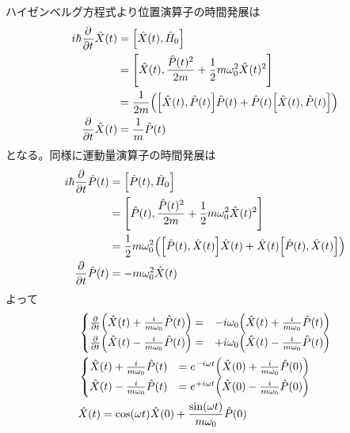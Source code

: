 \documentclass[../ap_2013.tex]{subfiles}
\begin{document}
\section{}
ハイゼンベルグ方程式より位置演算子の時間発展は
\begin{equation}\begin{aligned}[b]
    i\hbar\pdv{t}\hat{X}(t)
        &= \qty[\hat{X}(t),\hat{H}_0]\\
        &= \qty[\hat{X}(t),\frac{\hat{P}(t)^2}{2m}+\frac{1}{2}m\omega_0^2\hat{X}(t)^2]\\
        &= \frac{1}{2m}\qty(\qty[\hat{X}(t),\hat{P}(t)]\hat{P}(t)+\hat{P}(t)\qty[\hat{X}(t),\hat{P}(t)])\\
    \pdv{t}\hat{X}(t)
        &= \frac{1}{m}\hat{P}(t)
\end{aligned}\end{equation}
となる。同様に運動量演算子の時間発展は
\begin{equation}\begin{aligned}[b]
    i\hbar\pdv{t}\hat{P}(t)
        &= \qty[\hat{P}(t),\hat{H}_0]\\
        &= \qty[\hat{P}(t),\frac{\hat{P}(t)^2}{2m}+\frac{1}{2}m\omega_0^2\hat{X}(t)^2]\\
        &= \frac{1}{2}m\omega_0^2\qty(\qty[\hat{P}(t),\hat{X}(t)]\hat{X}(t)+\hat{X}(t)\qty[\hat{P}(t),\hat{X}(t)])\\
    \pdv{t}\hat{P}(t)
        &= -m\omega_0^2\hat{X}(t)
\end{aligned}\end{equation}
よって
\begin{equation}\begin{aligned}[b]
    &\begin{cases}
        \pdv{t}\qty(\hat{X}(t)+\frac{i}{m\omega_0}\hat{P}(t)) =& -i\omega_0\qty(\hat{X}(t)+\frac{i}{m\omega_0}\hat{P}(t))\\
        \pdv{t}\qty(\hat{X}(t)-\frac{i}{m\omega_0}\hat{P}(t)) =& +i\omega_0\qty(\hat{X}(t)-\frac{i}{m\omega_0}\hat{P}(t))
    \end{cases}\\
    &\begin{cases}
        \hat{X}(t)+\frac{i}{m\omega_0}\hat{P}(t) &= e^{-i\omega t}\qty(\hat{X}(0)+\frac{i}{m\omega_0}\hat{P}(0))\\
        \hat{X}(t)-\frac{i}{m\omega_0}\hat{P}(t) &= e^{+i\omega t}\qty(\hat{X}(0)-\frac{i}{m\omega_0}\hat{P}(0))\\
    \end{cases}\\
    & \hat{X}(t) = \cos(\omega t)\hat{X}(0)+\frac{\sin(\omega t)}{m\omega_0}\hat{P}(0)
\end{aligned}\end{equation}
\end{document}
